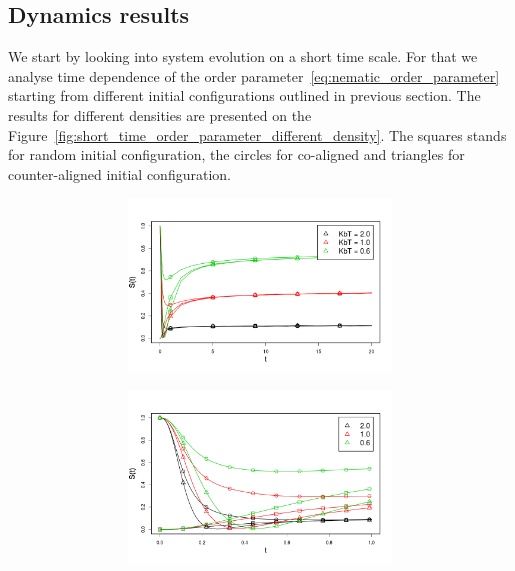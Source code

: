 \subsection{Dynamics results}
\label{subsec:molecular_dynamics_results}

We start by looking into system evolution on a short time scale. For that we analyse time dependence of the order parameter~\eqref{eq:nematic_order_parameter} starting from different initial configurations outlined in previous section. The results for different densities are presented on the Figure~\ref{fig:short_time_order_parameter_different_density}. The squares stands for random initial configuration, the circles for co-aligned and triangles for counter-aligned initial configuration.

\begin{figure}[h]
\centering
\begin{subfigure}[t]{0.32\textwidth}
\begin{subfigure}[t]{\textwidth}
	\centering
	\includegraphics[width=\textwidth]{Images/op_relaxation_long_rho_05.png}
\end{subfigure}
\begin{subfigure}[t]{\textwidth}
	\centering
	\includegraphics[width=\textwidth]{Images/op_relaxation_short_rho_05.png}

\end{subfigure}
\end{subfigure}
\end{figure}
